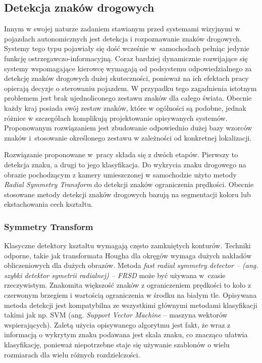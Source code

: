 
\subsection{Detekcja znaków drogowych}

Innym w swojej naturze zadaniem stawianym przed systemami wizyjnymi w pojazdach autonomicznych jest detekcja i rozpoznawanie znaków drogowych. %
Systemy tego typu pojawiały się dość wcześnie w~samochodach pełniąc jedynie funkcję ostrzegawczo-informacyjną.
Coraz bardziej dynamicznie rozwijające się systemy wspomagające kierowcę wymagają od podsystemu odpowiedzialnego za detekcję znaków drogowych dużej skuteczności, ponieważ na ich efektach pracy opierają decyzje o sterowaniu pojazdem. %
W przypadku tego zagadnienia istotnym problemem jest brak ujednoliconego zestawu znaków dla całego świata. %
Obecnie każdy kraj posiada swój zestaw znaków, które w ogólności są podobne, jednak różnice w szczegółach komplikują projektowanie opisywanych systemów. %
Proponowanym rozwiązaniem jest zbudowanie odpowiednio dużej bazy wzorców znaków i~stosowanie określonego zestawu w zależności od konkretnej lokalizacji. 

Rozwiązanie proponowane w~pracy \cite{T2} składa się z dwóch etapów. 
Pierwszy to detekcja znaku, a drugi to jego klasyfikacja. 
Do wykrycia znaku drogowego na obrazie pochodzącym z kamery umieszczonej w samochodzie użyto metody \textit{Radial Symmetry Transform} do detekcji znaków ograniczenia prędkości. 
Obecnie stosowane metody detekcji znaków drogowych bazują na segmentacji koloru lub ekstachowania cech kształtu. %

\subsubsection{Symmetry Transform}

Klasyczne detektory kształtu wymagają często zamkniętych konturów. 
Techniki odporne, takie jak transformata Hougha dla okręgów wymaga dużych nakładów obliczeniowych dla dużych obrazów. 
Metoda \textit{\textit{fast radial symmetry detector} -- (ang. szybki detektor symetrii radialnej) -- FRSD} może być używana w~czasie rzeczywistym. %
Znakomita większość znaków z ograniczeniem prędkości to koło z czerwonym brzegiem i wartością ograniczenia w środku na białym tle. 
Opisywana metoda detekcji jest kompatybilna ze wszystkimi głównymi metodami klasyfikacji takimi jak np. SVM (ang. \textit{Support Vector Machine} -- maszyna wektorów wspierających). 
Zaletą użycia opisywanego algorytmu jest fakt, że wraz z informacją o wykrytym znaku podawana jest skala znaku, co znacząco ułatwia klasyfikację, ponieważ niepotrzebne staje się używanie szablonów o wielu rozmiarach dla wielu różnych rozdzielczości. %

